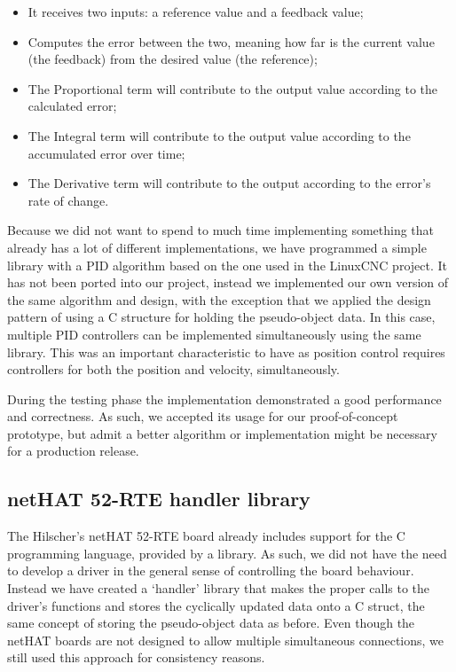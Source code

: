 \begin{itemize}
	\item It receives two inputs: a reference value and a feedback value;
	\item Computes the error between the two, meaning how far is the current value (the feedback) from the desired value (the reference);
	\item The Proportional term will contribute to the output value according to the calculated error;
	\item The Integral term will contribute to the output value according to the accumulated error over time;
	\item The Derivative term will contribute to the output according to the error's rate of change.
\end{itemize}

Because we did not want to spend to much time implementing something that already has a lot of different implementations, we have programmed a simple library with a PID algorithm based on the one used in the LinuxCNC \cite{sw:linuxcnc} project.
It has not been ported into our project, instead we implemented our own version of the same algorithm and design, with the exception that we applied the design pattern of using a C structure for holding the pseudo-object data.
In this case, multiple PID controllers can be implemented simultaneously using the same library.
This was an important characteristic to have as position control requires controllers for both the position and velocity, simultaneously.

During the testing phase the implementation demonstrated a good performance and correctness.
As such, we accepted its usage for our proof-of-concept prototype, but admit a better algorithm or implementation might be necessary for a production release.

\subsection{netHAT 52-RTE handler library}
The Hilscher's netHAT 52-RTE board already includes support for the C programming language, provided by a library.
As such, we did not have the need to develop a driver in the general sense of controlling the board behaviour.
Instead we have created a `handler' library that makes the proper calls to the driver's functions and stores the cyclically updated data onto a C struct, the same concept of storing the pseudo-object data as before.
Even though the netHAT boards are not designed to allow multiple simultaneous connections, we still used this approach for consistency reasons.

